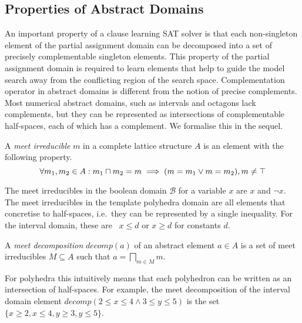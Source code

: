 \subsection{Properties of Abstract Domains}
%
An important property of a clause learning SAT solver is that each
non-singleton element of the partial assignment domain can be 
decomposed into a set of precisely complementable singleton elements.  
This property of the partial assignment domain is required to learn 
elements that help to guide the model search away from the
conflicting region of the search space.  Complementation operator 
in abstract domains is different from the notion of precise complements. 
%
Most numerical abstract domains, such as intervals and octagons lack
complements, but they can be represented as intersections of
complementable half-spaces, each of which has a complement. 
%
We formalise this in the sequel.
%
\begin{definition} 
A \emph{meet irreducible} $m$ in a complete lattice 
structure $A$ is an element with the following property.
\[\forall m_1, m_2 \in A: m_1 \sqcap m_2 = m \implies (m = m_1 \lor m = m_2), m \neq \top \]  
\end{definition}
%
The meet irreducibles in the boolean domain $\mathcal{B}$ for a variable $x$ are 
$x$ and $\neg x$. The meet 
irreducibles in the template polyhedra domain are all elements 
that concretise to half-spaces, i.e.\ they can be represented 
by a single inequality. For the interval domain, these are 
\ $x \leq d$ or $x \geq d$ for constants $d$. 


\begin{definition}
A \emph{meet decomposition} $\mathit{decomp}(a)$ of an abstract
element $a \in A$ is a set of meet irreducibles $M \subseteq A$ such that 
$a=\bigsqcap_{m\in M} m$.
\end{definition}

For polyhedra this intuitively means that each polyhedron can be
written as an intersection of half-spaces.
%
For example, the meet decomposition of the interval domain element
$decomp(2\leq x\leq 4 \wedge 3\leq y\leq 5)$ is
the set $\{x\geq 2, x\leq 4, y\geq 3, y\leq 5\}$.

